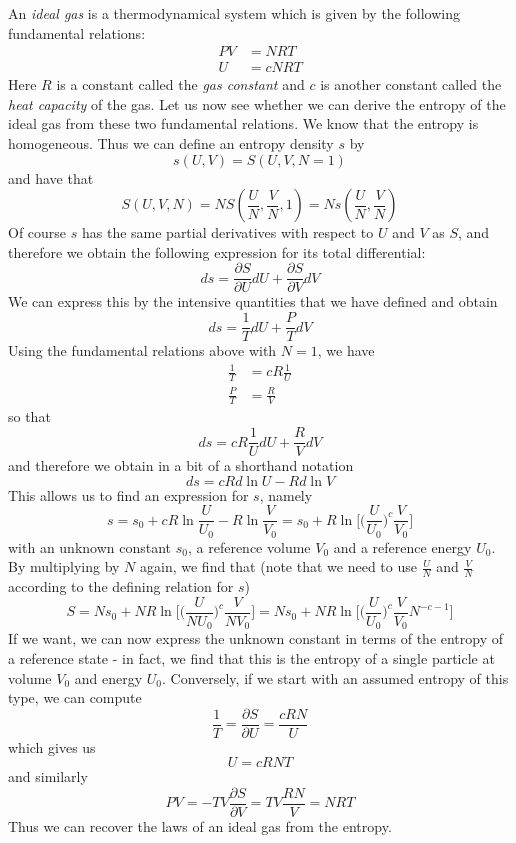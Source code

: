 \documentclass[a4paper, draft]{report}
\numberwithin{section}{chapter}
\numberwithin{equation}{chapter}
\theoremstyle{own}
\theoremstyle{remark}
\begin{document}
An {\em ideal gas}  is a thermodynamical system which is given by the following fundamental relations:
\begin{align*}
PV &= NRT \\
U &= cNRT
\end{align*}
Here $R$ is a constant called the {\em gas constant} and $c$ is another constant called the {\em heat capacity} of the gas. Let us now see whether we can derive the entropy of the ideal gas from these two fundamental relations. We know that the entropy is homogeneous. Thus we can define an entropy density $s$ by
$$
s(U,V) = S(U,V,N=1)
$$
and have that
$$
S(U,V,N) = N S(\frac{U}{N}, \frac{V}{N}, 1) = N s(\frac{U}{N}, \frac{V}{N})
$$
Of course $s$ has the same partial derivatives with respect to $U$ and $V$ as $S$, and therefore we obtain the following expression for its total differential:
$$
ds = \frac{\partial S}{\partial U} dU + \frac{\partial S}{\partial V} dV
$$
We can express this by the intensive quantities that we have defined and obtain
$$
ds = \frac{1}{T} dU +  \frac{P}{T} dV
$$
Using the fundamental relations above with $N=1$, we have
\begin{align*}
\frac{1}{T} &= cR \frac{1}{U} \\
\frac{P}{T} &= \frac{R}{V} 
\end{align*}
so that
$$
ds = cR \frac{1}{U} dU + \frac{R}{V} dV
$$
and therefore we obtain in a bit of a shorthand notation
$$
ds =  cR d \ln U - R d \ln V
$$
This allows us to find an expression for $s$, namely
$$
s = s_0 + cR \ln \frac{U}{U_0} - R \ln \frac{V}{V_0} = s_0 + R \ln \big[ \big( \frac{U}{U_0} \big)^c \frac{V}{V_0} \big]
$$
with an unknown constant $s_0$, a reference volume $V_0$ and a reference energy $U_0$. 
By multiplying by $N$ again, we find that (note that we need to use $\frac{U}{N}$ and $\frac{V}{N}$ according to the defining relation for $s$)
$$
S = N s_0 + N R \ln \big[ \big( \frac{U}{N U_0} \big)^c \frac{V}{N V_0} \big] = N s_0 + N R \ln \big[ \big( \frac{U}{U_0} \big)^c \frac{V}{V_0} N^{-c - 1}  \big]
$$
If we want, we can now express the unknown constant in terms of the entropy of a reference state - in fact, we find that this is the entropy of a single particle at volume $V_0$ and energy $U_0$. Conversely, if we start with an assumed entropy of this type, we can compute 
$$
\frac{1}{T} = \frac{\partial S}{\partial U} = \frac{cRN}{U}
$$
which gives us
$$
U = cRNT
$$
and similarly 
$$
PV = -TV \frac{\partial S}{\partial V} = TV \frac{RN}{V} = NRT
$$
Thus we can recover the laws of an ideal gas from the entropy. 
\end{document}
